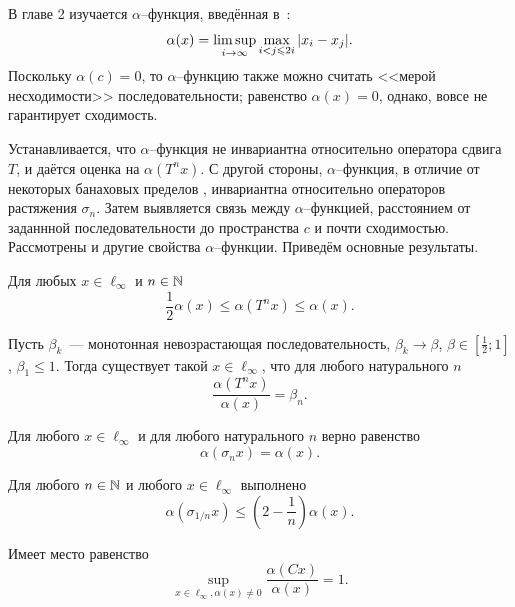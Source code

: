 В главе 2
изучается $\alpha$--функция, введённая в~\cite{our-vzms-2018}:
\begin{equation}
	\alpha(x) = \varlimsup_{i\to\infty} \max_{i<j\leqslant 2i} |x_i - x_j|
	.
\end{equation}
%
%
Поскольку $\alpha(c)=0$,
то $\alpha$--функцию также можно считать <<мерой несходимости>> последовательности;
равенство $\alpha(x) = 0$, однако, вовсе не гарантирует сходимость.

Устанавливается, что $\alpha$--функция не инвариантна относительно оператора сдвига $T$,
и даётся оценка на $\alpha(T^n x)$.
С другой стороны, $\alpha$--функция, в отличие от некоторых банаховых пределов
\cite{Semenov2010invariant,Semenov2011dan},
инвариантна относительно операторов растяжения $\sigma_n$.
Затем выявляется связь между $\alpha$--функцией, расстоянием от заданнной последовательности до пространства $c$
и почти сходимостью.
Рассмотрены и другие свойства $\alpha$--функции.
Приведём основные результаты.

	Для любых $x\in\ell_\infty$ и $n \in \N$
	\begin{equation}\label{est_alpha_Tn_x}
		\frac{1}{2}\alpha(x) \leq \alpha(T^n x) \leq \alpha(x)
		.
	\end{equation}

	Пусть $\beta_k$~--- монотонная невозрастающая последовательность,
	$\beta_k \to \beta$, $\beta\in\left[\frac{1}{2}; 1\right]$, $\beta_1 \leq 1$.
	Тогда существует такой $x\in\ell_\infty$, что для любого натурального $n$
	\begin{equation}
		\frac{\alpha(T^n x)}{\alpha(x)} = \beta_n.
	\end{equation}

	Для любого $x\in\ell_\infty$ и для любого натурального $n$ верно равенство
	\begin{equation}
		\alpha(\sigma_n x) = \alpha(x)
		.
	\end{equation}

	Для любого $n\in\N$ и любого $x\in\ell_\infty$ выполнено
	\begin{equation}
		\alpha(\sigma_{1/n} x) \leq \left( 2- \frac{1}{n} \right) \alpha(x)
		.
	\end{equation}

	Имеет место равенство
	\begin{equation}
		\sup_{x\in\ell_\infty, \alpha(x)\neq 0} \frac{\alpha(Cx)}{\alpha(x)}=1
		.
	\end{equation}

